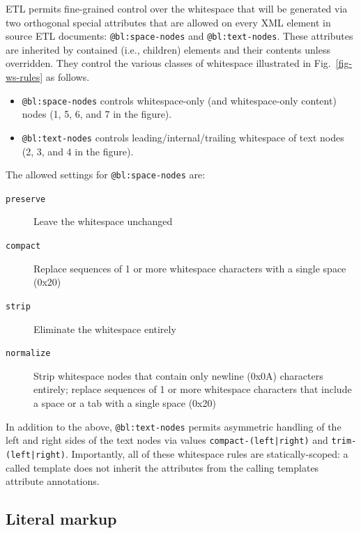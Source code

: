 \documentclass{www2003-submission}
\newcommand{\smtexttt}[1]{{\small\texttt{#1}}}
\newcommand{\figref}[1]{Fig.~\ref{fig-#1}}
\begin{document}
ETL permits fine-grained control over the whitespace that will be
generated via two orthogonal special attributes that are allowed on
every XML element in source ETL documents: \smtexttt{@bl:space-nodes}
and \smtexttt{@bl:text-nodes}.  These attributes are inherited by
contained (i.e., children) elements and their contents unless
overridden.  They control the various classes of whitespace
illustrated in \figref{ws-rules} as follows.

\begin{itemize}
\item \smtexttt{@bl:space-nodes} controls whitespace-only (and
      whitespace-only content) nodes (1, 5, 6, and 7 in the figure).
\item \smtexttt{@bl:text-nodes} controls leading/internal/trailing whitespace of
      text nodes (2, 3, and 4 in the figure).
\end{itemize}

The allowed settings for \smtexttt{@bl:space-nodes} are:

\begin{description}
  
\item[\smtexttt{preserve}] Leave the whitespace unchanged
      
\item[\smtexttt{compact}] Replace sequences of 1 or more
      whitespace characters with a single space (0x20)
      
\item[\smtexttt{strip}] Eliminate the whitespace entirely

\item[\smtexttt{normalize}] Strip whitespace nodes that contain only
newline (0x0A) characters entirely; replace sequences of 1 or more
whitespace characters that include a space or a tab with a single
space (0x20)

\end{description}

In addition to the above, \smtexttt{@bl:text-nodes} permits asymmetric
handling of the left and right sides of the text nodes via values
\smtexttt{compact-(left|right)} and \smtexttt{trim-(left|right)}. 
Importantly, all of these whitespace rules are statically-scoped:
a called template does not inherit the attributes from the calling
templates attribute annotations.

\subsection{Literal markup}
\label{ssec-literal-markup}
\end{document}
